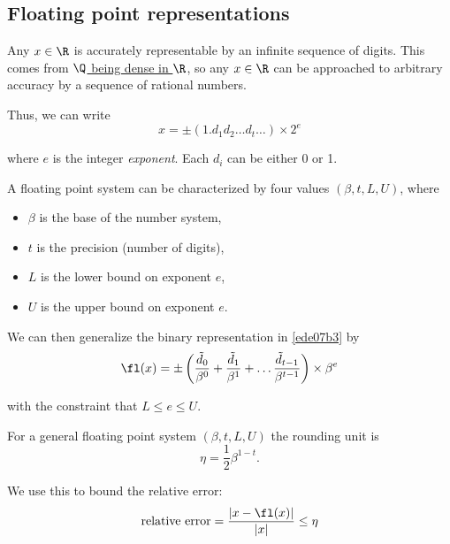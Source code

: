 \subsection{Floating point representations}\label{e5cedb7}

\label{ede07b3}

Any $x\in\R$ is accurately representable by an infinite sequence of digits.
This comes from \href{bb3cf6b}{$\Q$ being dense in $\R$}, so any $x\in\R$ can
be approached to arbitrary accuracy by a sequence of rational numbers.

Thus, we can write
$$
  x=\pm(1.d_1d_2\ldots d_t\ldots)\times2^e
$$

where $e$ is the integer \textit{exponent}. Each $d_i$ can be either 0 or 1.

\label{de15ad9}

A floating point system can be characterized by four values $(\beta,t,L,U)$,
where
\begin{itemize}
  \item $\beta$ is the base of the number system,
  \item $t$ is the precision (number of digits),
  \item $L$ is the lower bound on exponent $e$,
  \item $U$ is the upper bound on exponent $e$.
\end{itemize}

We can then generalize the binary representation in \autoref{ede07b3} by
$$
  \fl(x)=\pm\left(
  \frac{\tilde d_0}{\beta^0}+\frac{\tilde d_1}{\beta^1}+\ldots
  \frac{\tilde d_{t-1}}{\beta^{t-1}}\right)\times\beta^e
$$

with the constraint that $L\leq e\leq U$.

\label{e4a24af}

For a general floating point system $(\beta,t,L,U)$ the rounding unit is
$$
  \eta=\frac12\beta^{1-t}.
$$

We use this to bound the relative error:
$$
  \text{relative error}=\frac{|x-\fl(x)|}{|x|}\leq\eta
$$
